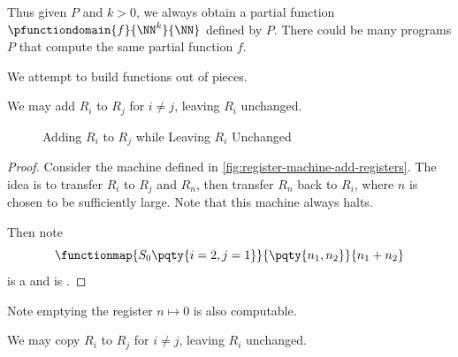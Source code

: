 Thus given \(P\) and \(k > 0\), we always obtain a partial function \(\pfunctiondomain{f}{\NN^k}{\NN}\) defined by \(P\). There could be many programs \(P\) that compute the same partial function \(f\).

We attempt to build functions out of pieces.

\begin{lemma}
    \label{lem:register-machine-add-registers}%
    We may add \(R_i\) to \(R_j\) for \(i \neq j\), leaving \(R_i\) unchanged.
\end{lemma}

\begin{figure}[ht!]
    \centering
    \caption{Adding \(R_i\) to \(R_j\) while Leaving \(R_i\) Unchanged}
    \label{fig:register-machine-add-registers}%
\end{figure}

\begin{proof}
    Consider the machine defined in \autoref{fig:register-machine-add-registers}. The idea is to transfer \(R_i\) to \(R_j\) and \(R_n\), then transfer \(R_n\) back to \(R_i\), where \(n\) is chosen to be sufficiently large. Note that this machine always halts.
    
    Then note
    \[
        \functionmap{S_0 \pqty{i = 2, j = 1}}{\pqty{n_1, n_2}}{n_1 + n_2}
    \]
    is a  and is .
\end{proof}

Note emptying the register \(n \mapsto 0\) is also computable.

\begin{corollary}
    We may copy \(R_i\) to \(R_j\) for \(i \neq j\), leaving \(R_i\) unchanged.
\end{corollary}

